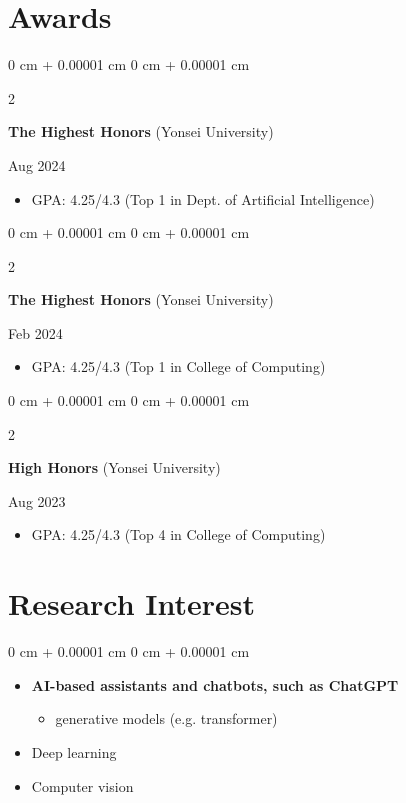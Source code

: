 \documentclass[10pt, letterpaper]{article}
\newenvironment{highlights}{
    \begin{itemize}[
        topsep=0.10 cm,
        parsep=0.10 cm,
        partopsep=0pt,
        itemsep=0pt,
        leftmargin=0 cm + 10pt
    ]
}{
    \end{itemize}
} %
\newenvironment{onecolentry}{
    \begin{adjustwidth}{
        0 cm + 0.00001 cm
    }{
        0 cm + 0.00001 cm
    }
}{
    \end{adjustwidth}
} %
\newenvironment{twocolentry}[2][]{
    \onecolentry
    \def\secondColumn{#2}
    \setcolumnwidth{\fill, 4.5 cm}
    \begin{paracol}{2}
}{
    \switchcolumn \raggedleft \secondColumn
    \end{paracol}
    \endonecolentry
} %
\begin{document}
    \section{Awards}
        \begin{twocolentry}{
            Aug 2024
        }
            \textbf{The Highest Honors} (Yonsei University)
        \end{twocolentry}
        \begin{highlights}
            \item GPA: 4.25/4.3 (Top 1 in Dept. of Artificial Intelligence)
        \end{highlights}
        \vspace{0.10 cm}
        \begin{twocolentry}{
            Feb 2024
        }
            \textbf{The Highest Honors} (Yonsei University)
        \end{twocolentry}
        \begin{highlights}
            \item GPA: 4.25/4.3 (Top 1 in College of Computing)
        \end{highlights}
        \vspace{0.10 cm}
        \begin{twocolentry}{
            Aug 2023
        }
            \textbf{High Honors} (Yonsei University)
        \end{twocolentry}
        \begin{highlights}
            \item GPA: 4.25/4.3 (Top 4 in College of Computing)
        \end{highlights}
        \vspace{0.10 cm}

    \section{Research Interest}
        \begin{onecolentry}
            \begin{highlights}
                \item \textbf{AI-based assistants and chatbots, such as ChatGPT}
                \begin{itemize}
                    \item generative models (e.g. transformer)
                \end{itemize}
                \item Deep learning
                \item Computer vision
            \end{highlights}
        \end{onecolentry}
\end{document}
